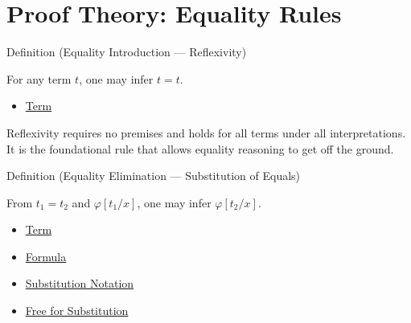 
\section{Proof Theory: Equality Rules}


\begin{definitionbox}{Definition (Equality Introduction --- Reflexivity)}
\begin{definition}\label{def:eq-refl}
For any term $t$, one may infer $t = t$.
\end{definition}
\end{definitionbox}

\begin{dependencies}
\begin{itemize}
  \item \hyperref[def:term]{Term}
\end{itemize}
\end{dependencies}

\begin{remark*}
Reflexivity requires no premises and holds for all terms under all
interpretations. It is the foundational rule that allows equality reasoning to
get off the ground.
\end{remark*}

\begin{definitionbox}{Definition (Equality Elimination --- Substitution of Equals)}
\begin{definition}\label{def:eq-elim}
From $t_1 = t_2$ and $\varphi[t_1/x]$, one may infer $\varphi[t_2/x]$.
\end{definition}
\end{definitionbox}

\begin{dependencies}
\begin{itemize}
  \item \hyperref[def:term]{Term}
  \item \hyperref[def:formula]{Formula}
  \item \hyperref[def:subst-notation]{Substitution Notation}
  \item \hyperref[def:free-for]{Free for Substitution}
\end{itemize}
\end{dependencies}

